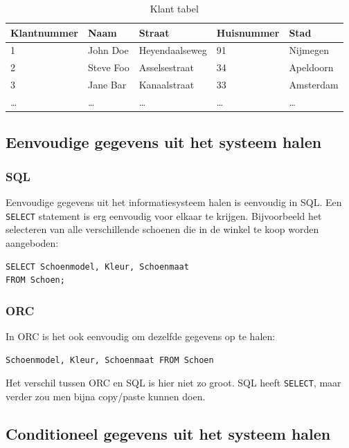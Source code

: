 \documentclass[10pt]{article}
\begin{document}
\begin{table}[hp]
  \centering
  \begin{tabular}{l|l|l|l|l}
    \textbf{Klantnummer} & \textbf{Naam} & \textbf{Straat} & \textbf{Huisnummer} & \textbf{Stad} \\
    \hline
    1 & John Doe & Heyendaalseweg & 91 & Nijmegen \\
    2 & Steve Foo & Asselsestraat & 34 & Apeldoorn \\
    3 & Jane Bar  & Kanaalstraat  & 33 & Amsterdam \\
    \dots & \dots & \dots& \dots& \dots \\
  \end{tabular}
  \caption{Klant tabel}
  \label{tab:klant}
\end{table}

\FloatBarrier
\subsection{Eenvoudige gegevens uit het systeem halen}

\subsubsection{SQL}

Eenvoudige gegevens uit het informatiesysteem halen is eenvoudig in SQL. Een
\verb+SELECT+ statement is erg eenvoudig voor elkaar te krijgen. Bijvoorbeeld
het selecteren van alle verschillende schoenen die in de winkel te koop worden
aangeboden:

\begin{verbatim}
SELECT Schoenmodel, Kleur, Schoenmaat 
FROM Schoen;
\end{verbatim}

\subsubsection{ORC}

In ORC is het ook eenvoudig om dezelfde gegevens op te halen:

\begin{verbatim}
Schoenmodel, Kleur, Schoenmaat FROM Schoen
\end{verbatim}

Het verschil tussen ORC en SQL is hier niet zo groot. SQL heeft \verb+SELECT+,
maar verder zou men bijna copy/paste kunnen doen.

\subsection{Conditioneel gegevens uit het systeem halen}
\end{document}
